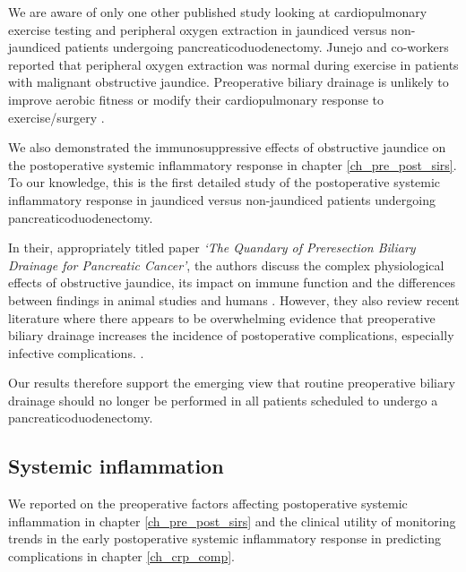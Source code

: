 We are aware of only one other published study looking at cardiopulmonary exercise testing and peripheral oxygen extraction in jaundiced versus non-jaundiced patients undergoing pancreaticoduodenectomy. 
Junejo and co-workers reported that peripheral oxygen extraction was normal during exercise in patients with malignant obstructive jaundice.\parencite{junejo_peripheral_2014} 
Preoperative biliary drainage is unlikely to improve aerobic fitness or modify their cardiopulmonary response to exercise/surgery \parencite{parker_serum_2014}.

We also demonstrated the immunosuppressive effects of obstructive jaundice on the postoperative systemic inflammatory response in chapter \ref{ch_pre_post_sirs}. 
To our knowledge, this is the first detailed study of the postoperative systemic inflammatory response in jaundiced versus non-jaundiced patients undergoing pancreaticoduodenectomy.

In their, appropriately titled paper \textit{`The Quandary of Preresection Biliary Drainage for Pancreatic Cancer'}, the authors discuss the complex physiological effects of obstructive jaundice, its impact on immune function and the differences between findings in animal studies and humans \parencite{tol_quandary_2012}.
However, they also review recent literature where there appears to be overwhelming evidence that preoperative biliary drainage increases the incidence of postoperative complications, especially infective complications. \parencite{van_der_gaag_preoperative_2010, arkadopoulos_preoperative_2014, fujii_preoperative_2015, furukawa_negative_2015}.


Our results therefore support the emerging view that routine preoperative biliary drainage should no longer be performed in all patients scheduled to undergo a pancreaticoduodenectomy.



\subsection{Systemic inflammation}
We reported on the preoperative factors affecting postoperative systemic inflammation in chapter \ref{ch_pre_post_sirs} and the clinical utility of monitoring trends in the early postoperative systemic inflammatory response in predicting complications in chapter \ref{ch_crp_comp}.

